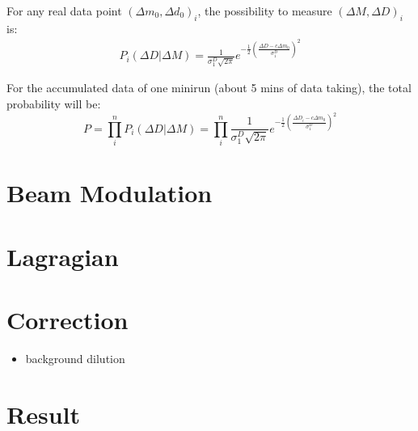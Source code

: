 For any real data point $(\Delta m_0, \Delta d_0)_i$, the possibility to measure
$(\Delta M, \Delta D)_i$ is:
\begin{equation*}
    \begin{gathered}
	P_i(\Delta D|\Delta M) = \frac{1}{\sigma_1^D\sqrt{2\pi}} 
	    e^{-\frac{1}{2}\left( \frac{\Delta D - c\Delta m_0}{\sigma_1^D}\right)^2}
    \end{gathered}
\end{equation*}

For the accumulated data of one minirun (about 5 mins of data taking), the total
probability will be:
\begin{equation*}
    P = \prod_i^n P_i(\Delta D|\Delta M) = \prod_i^n \frac{1}{\sigma_1^D\sqrt{2\pi}} 
	    e^{-\frac{1}{2}\left( \frac{\Delta D_i - c\Delta m_0}{\sigma_1^D}\right)^2}
\end{equation*}



\section{Beam Modulation}

\section{Lagragian}

\section{Correction}
\begin{itemize}
    \item background dilution
\end{itemize}
\section{Result}
